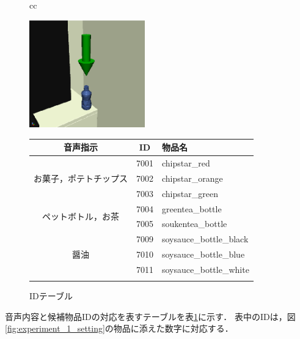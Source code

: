 \begin{figure}[htbp]
\begin{tabular}{cc}
%
  \begin{minipage}{0.3\textwidth}
    \begin{center}
      \includegraphics[width=50mm]{figure/arrow.eps}
      \caption{仮想空間上の明示}
      \label{fig:arrow}
    \end{center}
  \end{minipage}
%
  \begin{minipage}{0.7\textwidth}
    \begin{center}
    \makeatletter
    \def\@captype{table}
    \makeatother
    \caption{IDテーブル}
    \label{tb:id_table}
      \begin{tabular}{ccl} \bhline{1.2pt}
        音声指示 & ID & 物品名 \\ \hline
        \multirow{3}{*}{お菓子，ポテトチップス} & 7001 & chipstar\_red \\
        & 7002 & chipstar\_orange \\
        & 7003 & chipstar\_green \\ \hline
        \multirow{2}{*}{ペットボトル，お茶} & 7004 & greentea\_bottle \\
        & 7005 & soukentea\_bottle \\ \hline
        \multirow{3}{*}{醤油} & 7009 & soysauce\_bottle\_black \\
        & 7010 & soysauce\_bottle\_blue \\
        & 7011 & soysauce\_bottle\_white \\ \bhline{1.2pt}
      \end{tabular}
    \end{center}
  \end{minipage}
%
\end{tabular}
\end{figure}

音声内容と候補物品IDの対応を表すテーブルを表{\ref{tb:id_table}}に示す．
表中のIDは，図{\ref{fig:experiment_1_setting}}の物品に添えた数字に対応する．

